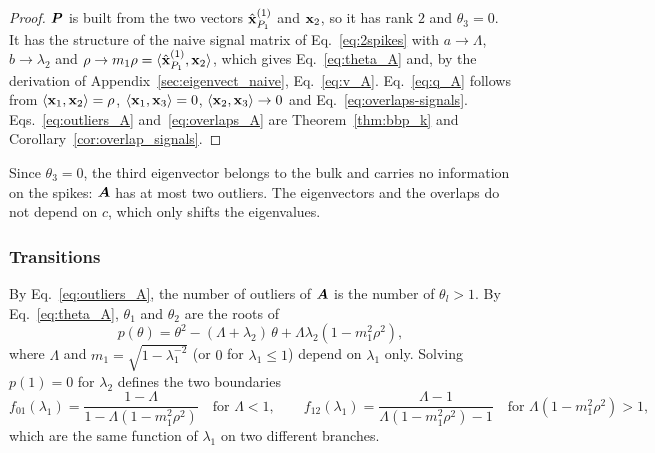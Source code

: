 \begin{proof}
$\bm{P}$ is built from the two vectors $\hat{\boldsymbol{\mathbf{x}}}^{(1)}_{P_1}$ and $\boldsymbol{\mathbf{x}}_2$, so it has rank $2$ and $\theta_3 = 0$. It has the structure of the naive signal matrix of Eq.~\eqref{eq:2spikes} with $a\to\Lambda$, $b\to\lambda_2$ and $\rho\to m_1\rho = \langle\hat{\boldsymbol{\mathbf{x}}}^{(1)}_{P_1},\boldsymbol{\mathbf{x}}_2\rangle$, which gives Eq.~\eqref{eq:theta_A} and, by the derivation of Appendix~\ref{sec:eigenvect_naive}, Eq.~\eqref{eq:v_A}. Eq.~\eqref{eq:q_A} follows from $\langle\boldsymbol{\mathbf{x}}_1,\boldsymbol{\mathbf{x}}_2\rangle = \rho$, $\langle\boldsymbol{\mathbf{x}}_1,\boldsymbol{\mathbf{x}}_3\rangle = 0$, $\langle\boldsymbol{\mathbf{x}}_2,\boldsymbol{\mathbf{x}}_3\rangle\to0$ and Eq.~\eqref{eq:overlaps-signals}. Eqs.~\eqref{eq:outliers_A} and~\eqref{eq:overlaps_A} are Theorem~\ref{thm:bbp_k} and Corollary~\ref{cor:overlap_signals}.
\end{proof}
\noindent
Since $\theta_3 = 0$, the third eigenvector belongs to the bulk and carries no information on the spikes: $\bm{A}$ has at most two outliers. The eigenvectors and the overlaps do not depend on $c$, which only shifts the eigenvalues.

\subsubsection{Transitions}\label{sec:transitions_A}
By Eq.~\eqref{eq:outliers_A}, the number of outliers of $\bm{A}$ is the number of $\theta_l > 1$. By Eq.~\eqref{eq:theta_A}, $\theta_1$ and $\theta_2$ are the roots of
\begin{equation}
    p(\theta) = \theta^2 - (\Lambda + \lambda_2)\,\theta + \Lambda\lambda_2(1 - m_1^2\rho^2) ,
    \label{eq:p_theta}
\end{equation}
where $\Lambda$ and $m_1 = \sqrt{1-\lambda_1^{-2}}$ (or $0$ for $\lambda_1 \le 1$) depend on $\lambda_1$ only. Solving $p(1)=0$ for $\lambda_2$ defines the two boundaries
\begin{equation}
    f_{01}(\lambda_1) = \frac{1-\Lambda}{1-\Lambda(1-m_1^2\rho^2)} \quad \text{for } \Lambda < 1,
    \qquad
    f_{12}(\lambda_1) = \frac{\Lambda-1}{\Lambda(1-m_1^2\rho^2)-1} \quad \text{for } \Lambda(1-m_1^2\rho^2) > 1 ,
    \label{eq:f01_f12}
\end{equation}
which are the same function of $\lambda_1$ on two different branches.

